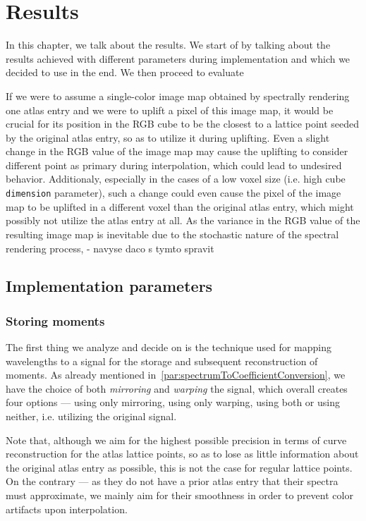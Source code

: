 \chapter{Results} \label{chap:results}

In this chapter, we talk about the results. We start of by talking about the results achieved with different parameters during implementation and which we decided to use in the end. We then proceed to evaluate

If we were to assume a single-color image map obtained by spectrally rendering one atlas entry and we were to uplift a pixel of this image map, it would be crucial for its position in the RGB cube to be the closest to a lattice point seeded by the original atlas entry, so as to utilize it during uplifting. Even a slight change in the RGB value of the image map may cause the uplifting to consider different point as primary during interpolation, which could lead to undesired behavior. Additionaly, especially in the cases of a low voxel size (i.e. high cube \texttt{dimension} parameter), such a change could even cause the pixel of the image map to be uplifted in a different voxel than the original atlas entry, which might possibly not utilize the atlas entry at all. As the variance in the RGB value of the resulting image map is inevitable due to the stochastic nature of the spectral rendering process, - navyse daco s tymto spravit

\section{Implementation parameters}

\subsection{Storing moments} \label{sec:storingMoments}

The first thing we analyze and decide on is the technique used for mapping wavelengths to a signal for the storage and subsequent reconstruction of moments. As already mentioned in~\cref{par:spectrumToCoefficientConversion}, we have the choice of both \emph{mirroring} and \emph{warping} the signal, which overall creates four options --- using only mirroring, using only warping, using both or using neither, i.e. utilizing the original signal.

Note that, although we aim for the highest possible precision in terms of curve reconstruction for the atlas lattice points, so as to lose as little information about the original atlas entry as possible, this is not the case for regular lattice points. On the contrary --- as they do not have a prior atlas entry that their spectra must approximate, we mainly aim for their smoothness in order to prevent color artifacts upon interpolation.

